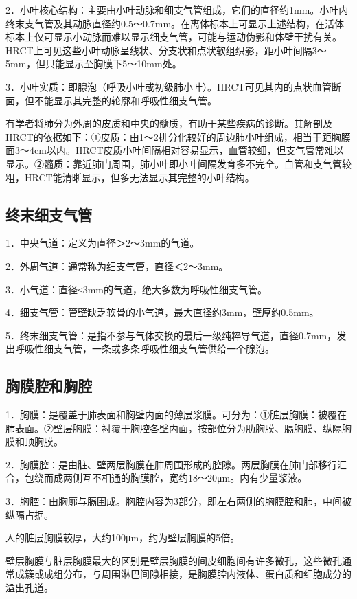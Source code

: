 2．小叶核心结构：主要由小叶动脉和细支气管组成，它们的直径约1mm。小叶内终末支气管及其动脉直径约0.5～0.7mm。在离体标本上可显示上述结构，在活体标本上仅可显示小动脉而难以显示细支气管，可能与运动伪影和体壁干扰有关。HRCT上可见这些小叶动脉呈线状、分支状和点状软组织影，距小叶间隔3～5mm，但只能显示至胸膜下5～10mm处。

3．小叶实质：即腺泡（呼吸小叶或初级肺小叶）。HRCT可见其内的点状血管断面，但不能显示其完整的轮廓和呼吸性细支气管。

有学者将肺分为外周的皮质和中央的髓质，有助于某些疾病的诊断。其解剖及HRCT的依据如下：①皮质：由1～2排分化较好的周边肺小叶组成，相当于距胸膜面3～4cm以内。HRCT皮质小叶间隔相对容易显示，血管较细，但支气管常难以显示。②髓质：靠近肺门周围，肺小叶即小叶间隔发育多不完全。血管和支气管较粗，HRCT能清晰显示，但多无法显示其完整的小叶结构。

\subsection{终末细支气管}

1．中央气道：定义为直径＞2～3mm的气道。

2．外周气道：通常称为细支气管，直径＜2～3mm。

3．小气道：直径≤3mm的气道，绝大多数为呼吸性细支气管。

4．细支气管：管壁缺乏软骨的小气道，最大直径约3mm，壁厚约0.5mm。

5．终末细支气管：是指不参与气体交换的最后一级纯粹导气道，直径0.7mm，发出呼吸性细支气管，一条或多条呼吸性细支气管供给一个腺泡。

\subsection{胸膜腔和胸腔}

1．胸膜：是覆盖于肺表面和胸壁内面的薄层浆膜。可分为：①脏层胸膜：被覆在肺表面。②壁层胸膜：衬覆于胸腔各壁内面，按部位分为肋胸膜、膈胸膜、纵隔胸膜和顶胸膜。

2．胸膜腔：是由脏、壁两层胸膜在肺周围形成的腔隙。两层胸膜在肺门部移行汇合，包绕而成两侧互不相通的胸膜腔，宽约18～20μm。内有少量浆液。

3．胸腔：由胸廓与膈围成。胸腔内容为3部分，即左右两侧的胸膜腔和肺，中间被纵隔占据。

人的脏层胸膜较厚，大约100μm，约为壁层胸膜的5倍。

壁层胸膜与脏层胸膜最大的区别是壁层胸膜的间皮细胞间有许多微孔，这些微孔通常成簇或成组分布，与周围淋巴间隙相接，是胸膜腔内液体、蛋白质和细胞成分的溢出孔道。

